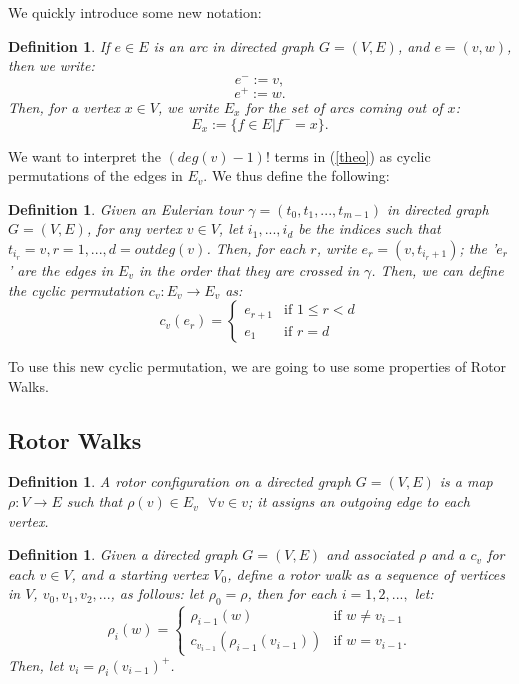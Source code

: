 \documentclass[11pt]{article}
\newtheorem{definition}[theorem]{Definition}
\newcommand{\keyword}[1]{{\emph{#1}}}
\begin{document}
We quickly introduce some new notation:

\begin{definition}
	If $e \in E$ is an arc in directed graph $G=(V,E)$, and $e=(v,w)$, then we write:
	$$e^-:=v,$$
	$$e^+:=w.$$
	Then, for a vertex $x \in V$, we write $E_x$ for the set of arcs coming out of $x$:
	$$E_x := \{ f \in E | f^-=x \}.$$
\end{definition}

We want to interpret the $(deg(v) - 1)!$ terms in (\ref{theo}) as cyclic permutations of the edges in $E_v$. We thus define the following:

\begin{definition}
	Given an Eulerian tour $\gamma=(t_0,t_1,...,t_{m-1})$ in directed graph $G=(V,E)$, for any vertex $v \in V$, let $i_1,...,i_d$ be 	the indices such that $t_{i_r}=v, r=1,...,d = outdeg(v)$. Then, for each $r$, write $e_r = (v,t_{i_r+1})$; the '$e_r$' are the 	edges in $E_v$ in the order that they are crossed in $\gamma$. Then, we can define the cyclic permutation $c_v: E_v \rightarrow 		E_v$ as:
	$$c_v(e_r) = \begin{cases}
														e_{r+1} & \text{if } 1 \leq r < d \\
														e_1			&	\text{if } r = d
							 \end{cases}$$
\end{definition}

To use this new cyclic permutation, we are going to use some properties of Rotor Walks.

\subsection{Rotor Walks}

\begin{definition}
	A \keyword{rotor configuration} on a directed graph $G=(V,E)$ is a map $\rho:V \rightarrow E$ such that $\rho(v) \in E_v \text{  } 	\forall v \in v$; it assigns an outgoing edge to each vertex.
\end{definition}

\begin{definition}
	Given a directed graph $G=(V,E)$ and associated $\rho$ and a $c_v$ for each $v \in V$, and a starting vertex $V_0$, define a \keyword{rotor walk} as a sequence of vertices in $V$, $v_0, v_1, v_2, ...$, as follows: let $\rho_0 = \rho$, then for each $i=1,2,...,$ let:
	$$\rho_i(w)= \begin{cases}
														\rho_{i-1}(w) 										& \text{if } w \neq v_{i-1} \\
														c_{v_{i-1}}(\rho_{i-1}(v_{i-1}))	&	\text{if } w=v_{i-1}.
							 \end{cases}$$
	Then, let $v_i = \rho_i(v_{i-1})^+$.
\end{definition}
\end{document}

